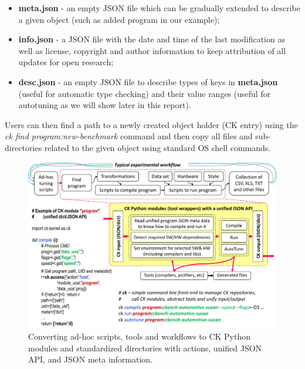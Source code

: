 \begin{itemize}

\item \textbf{meta.json} - an empty JSON file which can be gradually extended 
to describe a given object (such as added program in our example);

\item \textbf{info.json} - a JSON file with the date and time of the last modification
as well as license, copyright and author information to keep attribution of all updates
for open research;

\item \textbf{desc.json} - an empty JSON file to describe types of keys in \textbf{meta.json}
(useful for automatic type checking) and their value ranges (useful for autotuning
as we will show later in this report).

\end{itemize}

%
Users can then find a path to a newly created object holder (CK entry) using
the \textit{ck find program:new-benchmark} command and then copy all files and
sub-directories related to the given object using standard OS shell commands.

   \begin{figure}[htbp]
     \centering
      \includegraphics[width=6in]
      {ck-assets/bb46e3bcbfa20c5f-cropped.pdf} %
     \caption{
        Converting ad-hoc scripts, tools and workflows to CK Python modules
        and standardized directories with actions, unified JSON API, and JSON meta information.
     }
     \label{fig:ck-workflows}
   \end{figure}

